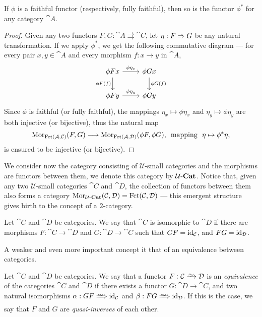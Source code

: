 \begin{lemma}
\label{lem:faithful-pushforward-functor}
If \(\phi\) is a faithful functor (respectively, fully faithful), then so is the
functor \(\phi^{*}\) for any category \(\cat A\).
\end{lemma}

\begin{proof}
Given any two functors \(F, G: \cat A \rightrightarrows \cat C\), let \(\eta: F
\Rightarrow G\) be any natural transformation. If we apply \(\phi^{*}\), we get the
following commutative diagram --- for every pair \(x, y \in \cat A\) and every
morphism \(f: x \to y\) in \(\cat A\),
\[
  \begin{tikzcd}
    \phi F x \ar[r, "\phi \eta_x"] \ar[d, swap, "\phi F(f)"]
    &\phi G x \ar[d, "\phi G(f)"] \\
    \phi F y \ar[r, "\phi \eta_y"]
    &\phi G y
  \end{tikzcd}
\]
Since \(\phi\) is faithful (or fully faithful), the mappings \(\eta_x \mapsto
\phi \eta_x\) and \(\eta_y \mapsto \phi \eta_y\) are both injective (or
bijective), thus the natural map
\[
  \operatorname{Mor}_{\operatorname{Fct}(\mathcal A, \mathcal C)}(F, G) \longrightarrow
  \operatorname{Mor}_{\operatorname{Fct}(\mathcal A, \mathcal D)}(\phi F, \phi G)\text{,}
  \ \text{ mapping }\ \eta \mapsto \phi^{*} \eta,
\]
is ensured to be injective (or bijective).
\end{proof}

We consider now the category consisting of \(\mathcal U\)-small categories and
the morphisms are functors between them, we denote this category by
\({\mathcal{U}\text{-}\textbf{Cat}}\). Notice that, given any two \(\mathcal U\)-small categories \(\cat C\)
and \(\cat D\), the collection of functors between them also forms a category
\(\operatorname{Mor}_{{\mathcal{U}\text{-}\textbf{Cat}}}(\mathcal C, \mathcal D) = \operatorname{Fct}(\mathcal C, \mathcal D)\) --- this emergent
structure gives birth to the concept of a \(2\)-category.

\begin{definition}
\label{def:isomorphism-categories}
Let \(\cat C\) and \(\cat D\) be categories. We say that \(\cat C\) is
isomorphic to \(\cat D\) if there are morphisms \(F: \cat C \to \cat D\) and
\(G: \cat D \to \cat C\) such that \(GF = \operatorname{id}_{\mathcal C}\), and \(FG = \operatorname{id}_{\mathcal
D}\).
\end{definition}

A weaker and even more important concept it that of an equivalence between
categories.

\begin{definition}
\label{def:equivalence-categories}
Let \(\cat C\) and \(\cat D\) be categories. We say that a functor \(F: \cat C
\isoto \cat D\) is an \emph{equivalence} of the categories \(\cat C\) and \(\cat
D\) if there exists a functor \(G: \cat D \to \cat C\), and two natural
isomorphisms \(\alpha: G F \isonat \Id_{\cat C}\) and \(\beta: F G \isonat
\Id_{\cat D}\). If this is the case, we say that \(F\) and \(G\) are
\emph{quasi-inverses} of each other.
\end{definition}

